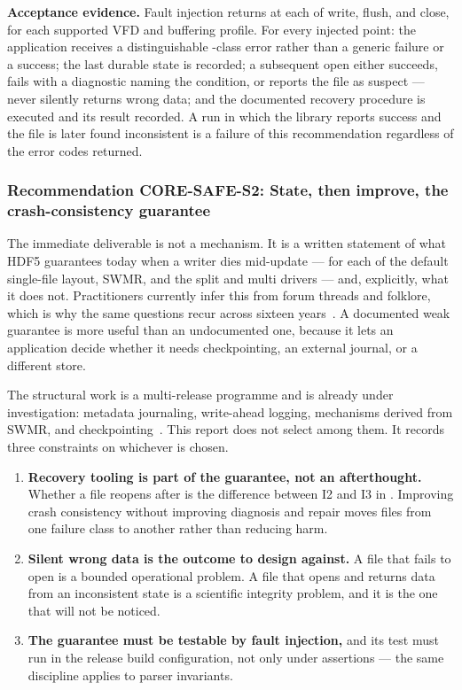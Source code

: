\documentclass[../main.tex]{subfiles}
\begin{document}
\noindent\textbf{Acceptance evidence.}
Fault injection returns  at each of write, flush, and close, for
each supported VFD and buffering profile. For every injected point: the
application receives a distinguishable -class error rather than a
generic failure or a success; the last durable state is recorded; a subsequent
open either succeeds, fails with a diagnostic naming the condition, or reports
the file as suspect --- never silently returns wrong data; and the documented
recovery procedure is executed and its result recorded. A run in which the
library reports success and the file is later found inconsistent is a failure
of this recommendation regardless of the error codes returned.

\subsubsection*{Recommendation CORE-SAFE-S2: State, then improve, the crash-consistency guarantee}

The immediate deliverable is not a mechanism. It is a written statement of what
HDF5 guarantees today when a writer dies mid-update --- for each of the default
single-file layout, SWMR, and the split and multi drivers --- and, explicitly,
what it does not. Practitioners currently infer this from forum threads and
folklore, which is why the same questions recur across sixteen
years~\cite{forum-crash-state-1598,forum-flush-crash-3481,
forum-crash-corruption-7581}. A documented weak guarantee is more useful than
an undocumented one, because it lets an application decide whether it needs
checkpointing, an external journal, or a different store.

The structural work is a multi-release programme and is already under
investigation: metadata journaling, write-ahead logging, mechanisms derived
from SWMR, and checkpointing~\cite{forum-crashproofing-12003}. This report does
not select among them. It records three constraints on whichever is chosen.

\begin{enumerate}
    \item \textbf{Recovery tooling is part of the guarantee, not an
          afterthought.} Whether a file reopens after  is the
          difference between I2 and I3 in . Improving
          crash consistency without improving diagnosis and repair moves files
          from one failure class to another rather than reducing harm.
    \item \textbf{Silent wrong data is the outcome to design against.} A file
          that fails to open is a bounded operational problem. A file that
          opens and returns data from an inconsistent state is a scientific
          integrity problem, and it is the one that will not be noticed.
    \item \textbf{The guarantee must be testable by fault injection,} and its
          test must run in the release build configuration, not only under
          assertions --- the same discipline  applies to parser
          invariants.
\end{enumerate}
\end{document}
